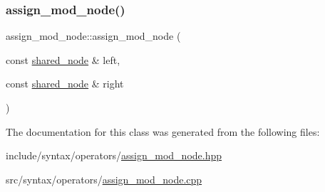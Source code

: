 \subsubsection{\texorpdfstring{assign\+\_\+mod\+\_\+node()}{assign\_mod\_node()}}
{\footnotesize\ttfamily assign\+\_\+mod\+\_\+node\+::assign\+\_\+mod\+\_\+node (\begin{DoxyParamCaption}\item[{const \hyperlink{namespacejawe_a3f307481d921b6cbb50cc8511fc2b544}{shared\+\_\+node} \&}]{left,  }\item[{const \hyperlink{namespacejawe_a3f307481d921b6cbb50cc8511fc2b544}{shared\+\_\+node} \&}]{right }\end{DoxyParamCaption})}



The documentation for this class was generated from the following files\+:\begin{DoxyCompactItemize}
\item 
include/syntax/operators/\hyperlink{assign__mod__node_8hpp}{assign\+\_\+mod\+\_\+node.\+hpp}\item 
src/syntax/operators/\hyperlink{assign__mod__node_8cpp}{assign\+\_\+mod\+\_\+node.\+cpp}\end{DoxyCompactItemize}
